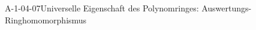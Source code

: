 
\begin{PROP}{A-1-04-07}{Universelle Eigenschaft des Polynomringes: Auswertungs-Ringhomomorphismus}
\end{PROP}
